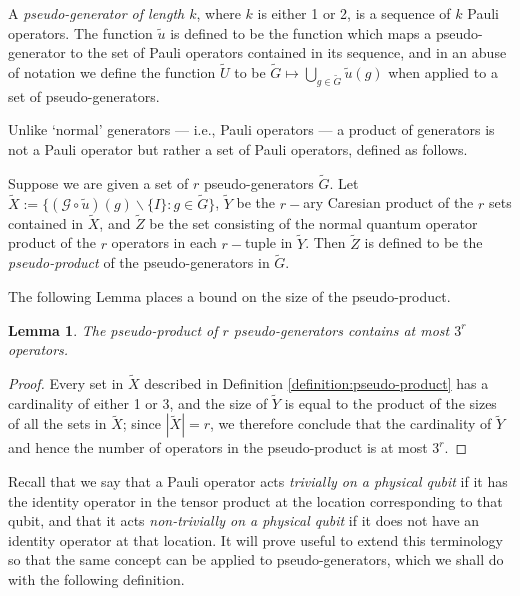 \documentclass[twocolumn,showpacs,preprintnumbers,amsmath,amssymb,nofootinbib,pra,floatfix]{revtex4-1}
\newtheorem{lemma}{Lemma}
\newenvironment{definition}[1][Definition]{\begin{trivlist}
\item[\hskip \labelsep {\bfseries #1}]}{\end{trivlist}}
\newenvironment{remark}[1][Remark]{\begin{trivlist}
\item[\hskip \labelsep {\bfseries #1}]}{\end{trivlist}}
\newcommand{\set}{\tilde}
\newcommand{\genfun}{\mathcal{G}}
\begin{document}
\begin{definition}
A \emph{pseudo-generator of length $k$}, where $k$ is either 1 or 2, is a sequence of $k$ Pauli operators.  The function $\set u$ is defined to be the function which maps a pseudo-generator to the set of Pauli operators contained in its sequence, and in an abuse of notation we define the function $\set U$ to be $\set G\mapsto \bigcup_{g\in\set G}\set u(g)$ when applied to a set of pseudo-generators.
\end{definition}
\begin{remark}
Unlike `normal' generators --- i.e., Pauli operators --- a product of generators is not a Pauli operator but rather a set of Pauli operators, defined as follows.
\end{remark}

\begin{definition}
\label{definition:pseudo-product}
Suppose we are given a set of $r$ pseudo-generators $\set G$.  Let $\set X:=\{(\genfun\circ\set u)(g)\backslash\{I\}: g\in\set G\}$, $\set Y$ be the $r-$ary Caresian product of the $r$ sets contained in $\set X$, and $\set Z$ be the set consisting of the normal quantum operator product of the $r$ operators in each $r-$tuple in $\set Y$.  Then $\set Z$ is defined to be the \emph{pseudo-product} of the pseudo-generators in $\set G$. 
\end{definition}

\begin{remark}
The following Lemma places a bound on the size of the pseudo-product.
\end{remark}

\begin{lemma}
The pseudo-product of $r$ pseudo-generators contains at most $3^r$ operators.
\end{lemma}

\begin{proof}
Every set in $\set X$ described in Definition \ref{definition:pseudo-product} has a cardinality of either 1 or 3, and the size of $\set Y$ is equal to the product of the sizes of all the sets in $\set X$;  since $|\set X|=r$, we therefore conclude that the cardinality of $\set Y$ and hence the number of operators in the pseudo-product is at most $3^r$.
\end{proof}
\begin{remark}
Recall that we say that a Pauli operator acts \emph{trivially on a physical qubit} if it has the identity operator in the tensor product at the location corresponding to that qubit, and that it acts \emph{non-trivially on a physical qubit} if it does not have an identity operator at that location.  It will prove useful to extend this terminology so that the same concept can be applied to pseudo-generators, which we shall do with the following definition.
\end{remark}
\end{document}
